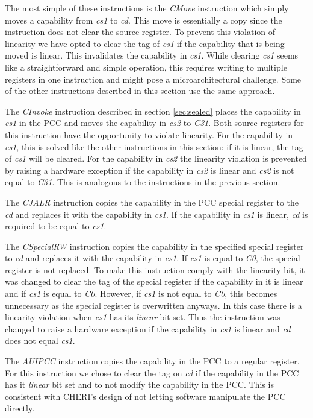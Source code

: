 The most simple of these instructions is the \textit{CMove} instruction which simply moves a capability from \textit{cs1} to \textit{cd}. This move is essentially a copy since the instruction does not clear the source register. To prevent this violation of linearity we have opted to clear the tag of \textit{cs1} if the capability that is being moved is linear. This invalidates the capability in \textit{cs1}. While clearing  \textit{cs1} seems like a straightforward and simple operation, this requires writing to multiple registers in one instruction and might pose a microarchitectural challenge. Some of the other instructions described in this section use the same approach.

The \textit{CInvoke} instruction described in section \ref{sec:sealed} places the capability in \textit{cs1} in the PCC and moves the capability in \textit{cs2} to \textit{C31}. Both source registers for this instruction have the opportunity to violate linearity. For the capability in \textit{cs1}, this is solved like the other instructions in this section: if it is linear, the tag of \textit{cs1} will be cleared. For the capability in \textit{cs2} the linearity violation is prevented by raising a hardware exception if the capability in \textit{cs2} is linear and \textit{cs2} is not equal to \textit{C31}. This is analogous to the instructions in the previous section.

The \textit{CJALR} instruction copies the capability in the PCC special register to the \textit{cd} and replaces it with the capability in \textit{cs1}. If the capability in \textit{cs1} is linear, \textit{cd} is required to be equal to \textit{cs1}.

The \textit{CSpecialRW} instruction copies the capability in the specified special register to \textit{cd} and replaces it with the capability in \textit{cs1}. If \textit{cs1} is equal to \textit{C0}, the special register is not replaced. To make this instruction comply with the linearity bit, it was changed to clear the tag of the special register if the capability in it is linear and if \textit{cs1} is equal to \textit{C0}. However, if \textit{cs1} is not equal to \textit{C0}, this becomes unnecessary as the special register is overwritten anyways. In this case there is a linearity violation when \textit{cs1} has its \textit{linear} bit set. Thus the instruction was changed to raise a hardware exception if the capability in  \textit{cs1} is linear and \textit{cd} does not equal \textit{cs1}.

The \textit{AUIPCC} instruction copies the capability in the PCC to a regular register. For this instruction we chose to clear the tag on \textit{cd} if the capability in the PCC has it \textit{linear} bit set and to not modify the capability in the PCC. This is consistent with CHERI's design of not letting software manipulate the PCC directly.

